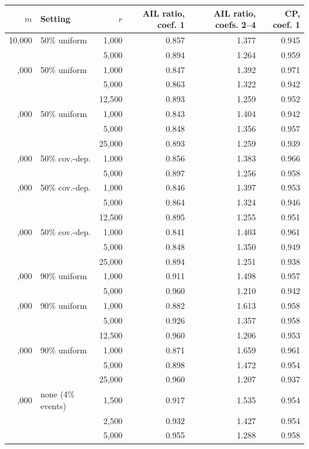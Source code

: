 \begin{tabular}{rlrrrr}
\toprule
\(m\) & Setting & \(r\) & AIL ratio, coef. 1 & AIL ratio, coefs. 2--4 & CP, coef. 1\\
\midrule
10,000 & 50\% uniform & 1,000 & 0.857 & 1.377 & 0.945\\
 &  & 5,000 & 0.894 & 1.264 & 0.959\\
\addlinespace
25,000 & 50\% uniform & 1,000 & 0.847 & 1.392 & 0.971\\
 &  & 5,000 & 0.863 & 1.322 & 0.942\\
 &  & 12,500 & 0.893 & 1.259 & 0.952\\
\addlinespace
50,000 & 50\% uniform & 1,000 & 0.843 & 1.404 & 0.942\\
 &  & 5,000 & 0.848 & 1.356 & 0.957\\
 &  & 25,000 & 0.893 & 1.259 & 0.939\\
\addlinespace
10,000 & 50\% cov.-dep. & 1,000 & 0.856 & 1.383 & 0.966\\
 &  & 5,000 & 0.897 & 1.256 & 0.958\\
\addlinespace
25,000 & 50\% cov.-dep. & 1,000 & 0.846 & 1.397 & 0.953\\
 &  & 5,000 & 0.864 & 1.324 & 0.946\\
 &  & 12,500 & 0.895 & 1.255 & 0.951\\
\addlinespace
50,000 & 50\% cov.-dep. & 1,000 & 0.841 & 1.403 & 0.961\\
 &  & 5,000 & 0.848 & 1.350 & 0.949\\
 &  & 25,000 & 0.894 & 1.251 & 0.938\\
\addlinespace
10,000 & 90\% uniform & 1,000 & 0.911 & 1.498 & 0.957\\
 &  & 5,000 & 0.960 & 1.210 & 0.942\\
\addlinespace
25,000 & 90\% uniform & 1,000 & 0.882 & 1.613 & 0.958\\
 &  & 5,000 & 0.926 & 1.357 & 0.958\\
 &  & 12,500 & 0.960 & 1.206 & 0.953\\
\addlinespace
50,000 & 90\% uniform & 1,000 & 0.871 & 1.659 & 0.961\\
 &  & 5,000 & 0.898 & 1.472 & 0.954\\
 &  & 25,000 & 0.960 & 1.207 & 0.937\\
\addlinespace
25,000 & none (4\% events) & 1,500 & 0.917 & 1.535 & 0.954\\
 &  & 2,500 & 0.932 & 1.427 & 0.954\\
 &  & 5,000 & 0.955 & 1.288 & 0.958\\

\end{tabular}
